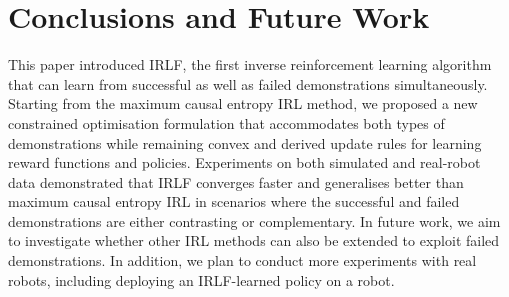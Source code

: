 \documentclass[letterpaper]{article}
\newcommand{\sw}[1]{\textcolor{red}{SW: #1}}
\newcommand{\jm}[1]{\textcolor{blue}{Joao: #1}}
\newcommand{\sw}[1]{}
\newcommand{\jm}[1]{}
\begin{document}

\section{Conclusions and Future Work}


This paper introduced IRLF, the first inverse reinforcement learning algorithm that can learn from successful as well as failed demonstrations simultaneously. Starting from the maximum causal entropy IRL method, we proposed a new constrained optimisation formulation that accommodates both types of demonstrations while remaining convex and derived update rules for learning reward functions and policies. Experiments on both simulated and real-robot data demonstrated that IRLF converges faster and generalises better than maximum causal entropy IRL in scenarios where the successful and failed demonstrations are either contrasting or complementary.  In future work, we aim to investigate whether other IRL methods can also be extended to exploit failed demonstrations.  In addition, we plan to conduct more experiments with real robots, including deploying an IRLF-learned policy on a robot.





	
\end{document}
